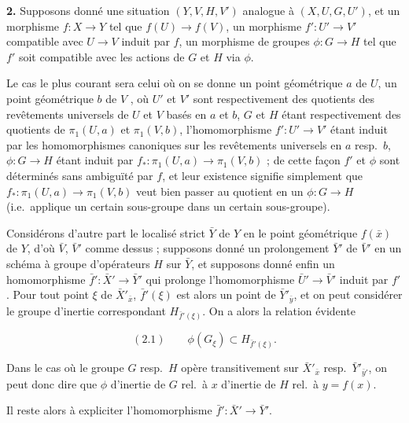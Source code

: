 \documentclass[11pt,a4paper]{article}
\begin{document}

\textbf{2.} Supposons donné une situation $(Y, V, H, V')$ analogue à $(X, U, G,
U')$, et un morphisme $f : X \to Y$ tel que $f(U) \to f(V)$, un morphisme $f' :
U' \to V'$ compatible avec $U \to V$ induit par $f$, un morphisme de groupes
$\phi : G \to H$ tel que \struck{\ill{}} $f'$ soit compatible avec les actions
de $G$ et $H$ via $\phi$.

Le cas le plus courant sera celui où on se donne un point géométrique $a$ de
$U$,  un point géométrique $b$ de $V$ , où $U'$ et $V'$
sont respectivement des quotients des revêtements universels de $U$ et $V$
basés en $a$ et $b$, $G$ et $H$ étant respectivement des quotients de
$\pi_{1}(U, a)$ et $\pi_{1}(V, b)$, l'homomorphisme $f' : U' \to V'$ étant
induit par les homomorphismes canoniques sur les revêtements universels en $a$
resp.\ $b$, \struck{\ill{}} $\phi : G \to H$ étant induit par $f_{*} :
\pi_{1}(U, a) \to \pi_{1}(V, b)$ ; de cette façon $f'$ et $\phi$ sont
déterminés sans ambiguïté par $f$, et leur existence signifie simplement que
$f_{*} : \pi_{1}(U, a) \to \pi_{1}(V, b)$ veut bien passer au quotient en un
$\phi : G \to H$ (i.e.\ applique un certain sous-groupe dans un certain
sous-groupe).

Considérons d'autre part le localisé strict $\bar{Y}$ de $Y$ en le point
géométrique $f(\bar{x})$ de $Y$, d'où $\bar{V}$, $\bar{V}'$ comme dessus ;
supposons donné un prolongement $\bar{Y}'$ de $\bar{V}'$ en un schéma à groupe
d'opérateurs $H$ sur $\bar{Y}$, et supposons donné enfin un homomorphisme
$\bar{f}' : \bar{X}' \to \bar{Y}'$ qui prolonge l'homomorphisme $\bar{U}' \to
\bar{V}'$ induit par $f'$. Pour tout point $\xi$ de $\bar{X}'_{\bar{x}}$,
$\bar{f}'(\xi)$ est alors un point de $\bar{Y}'_{\bar{y}}$, et on peut
considérer le groupe d'inertie correspondant $H_{\bar{f}'(\xi)}$. On a alors la
relation évidente

\begin{equation*}
(2.1) \qquad \phi(G_{\xi}) \subset H_{\bar{f}'(\xi)}.
\end{equation*}

Dans le cas où le groupe $G$ resp.\ $H$ opère transitivement sur
$\bar{X}'_{\bar{x}}$ resp.\ $\bar{Y}'_{\bar{y}'}$, on peut donc dire que $\phi$
  d'inertie de $G$ rel.\ à $x$  d'inertie de $H$ rel.\ à $y = f(x)$.

 Il reste alors à expliciter l'homomorphisme $\bar{f}' :
\bar{X}' \to \bar{Y}'$.
\end{document}
